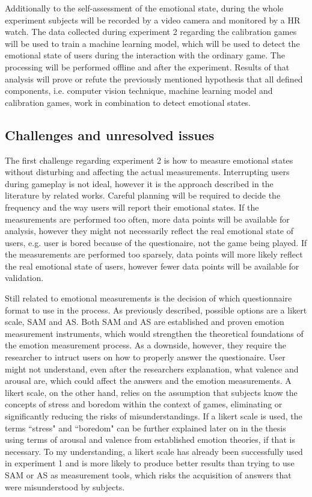 Additionally to the self-assessment of the emotional state, during the whole experiment subjects will be recorded by a video camera and monitored by a HR watch. The data collected during experiment 2 regarding the calibration games will be used to train a machine learning model, which will be used to detect the emotional state of users during the interaction with the ordinary game. The processing will be performed offline and after the experiment. Results of that analysis will prove or refute the previously mentioned hypothesis that all defined components, i.e. computer vision technique, machine learning model and calibration games, work in combination to detect emotional states.

\subsection{Challenges and unresolved issues}
\label{experiment2-challenges}

The first challenge regarding experiment 2 is how to measure emotional states without disturbing and affecting the actual measurements. Interrupting users during gameplay is not ideal, however it is the approach described in the literature by related works. Careful planning will be required to decide the frequency and the way users will report their emotional states. If the measurements are performed too often, more data points will be available for analysis, however they might not necessarily reflect the real emotional state of users, e.g. user is bored because of the questionaire, not the game being played. If the measurements are performed too sparsely, data points will more likely reflect the real emotional state of users, however fewer data points will be available for validation.

Still related to emotional measurements is the decision of which questionnaire format to use in the process. As previously described, possible options are a likert scale, SAM and AS. Both SAM and AS are established and proven emotion measurement instruments, which would strengthen the theoretical foundations of the emotion measurement process. As a downside, however, they require the researcher to intruct users on how to properly answer the questionaire. User might not understand, even after the researchers explanation, what valence and arousal are, which could affect the answers and the emotion measurements. A likert scale, on the other hand, relies on the assumption that subjects know the concepts of stress and boredom within the context of games, eliminating or significantly reducing the risks of misunderstandings. If a likert scale is used, the terms ``stress" and ``boredom" can be further explained later on in the thesis using terms of arousal and valence from established emotion theories, if that is necessary. To my understanding, a likert scale has already been successfully used in experiment 1 and is more likely to produce better results than trying to use SAM or AS as measurement tools, which risks the acquisition of answers that were misunderstood by subjects.

